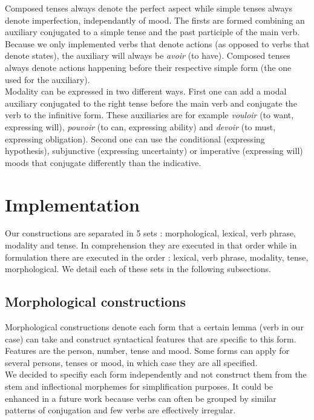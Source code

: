 \documentclass[a4paper,10pt]{article}
\begin{document}
Composed tenses always denote the perfect aspect while simple tenses always denote imperfection, independantly of mood. The firsts are formed combining an auxiliary conjugated to a simple tense and the past participle of the main verb. Because we only implemented verbs that denote actions (as opposed to verbs that denote states), the auxiliary will always be \textit{avoir} (to have). Composed tenses always denote actions happening before their respective simple form (the one used for the auxiliary). \\

Modality can be expressed in two different ways. First one can add a modal auxiliary conjugated to the right tense before the main verb and conjugate the verb to the infinitive form. These auxiliaries are for example \textit{vouloir} (to want, expressing will), \textit{pouvoir} (to can, expressing ability) and \textit{devoir} (to must, expressing obligation). Second one can use the conditional (expressing hypothesis), subjunctive (expressing uncertainty) or imperative (expressing will) moods that conjugate differently than the indicative.

\section{Implementation}

Our constructions are separated in 5 sets : morphological, lexical, verb phrase, modality and tense. In comprehension they are executed in that order while in formulation there are executed in the order : lexical, verb phrase, modality, tense, morphological. We detail each of these sets in the following subsections. \\

\subsection{Morphological constructions}

Morphological constructions denote each form that a certain lemma (verb in our case) can take and construct syntactical features that are specific to this form. Features are the person, number, tense and mood. Some forms can apply for several persons, tenses or mood, in which case they are all specified. \\

We decided to specifiy each form independently and not construct them from the stem and inflectional morphemes for simplification purposes. It could be enhanced in a future work because verbs can often be grouped by similar patterns of conjugation and few verbs are effectively irregular. \\
\end{document}
